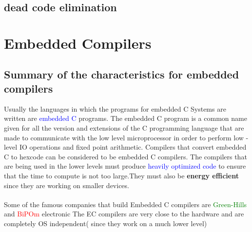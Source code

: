 \documentclass[a4paper, 12pt]{article}
\begin{document}
\subsection{dead code elimination}
\section{Embedded Compilers}
\subsection{Summary of the characteristics for embedded compilers}
Usually the languages in which the programs for embedded C Systems are written are \textcolor{blue}{embedded C} programs. The embedded C program is a common name given for all the version and extensions of the C programming language that are made to communicate with the low level microprocessor in order to perform low -level IO operations and fixed point arithmetic. Compilers that convert embedded C to hexcode can be considered to be embedded C compilers. The compilers that are being used in the lower levels must produce
\textcolor{blue}{heavily optimized code} to ensure that the time to compute is not too large.They must also be \textbf{energy efficient} since they are working on smaller devices.
\\
\\
Some of the famous companies that build Embedded C compilers are \textcolor{green}{Green-Hills} and \textcolor{red}{BiPOm} electronic
The EC compilers are very close to the hardware and are completely OS independent( since they work on a much lower level)
\end{document}
